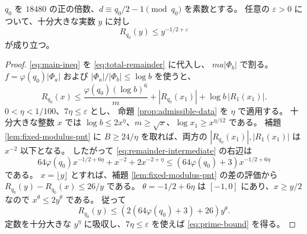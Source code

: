 \begin{corollary}[素数和の片側評価]\label{cor:prime-bound}
\(q_0\) を \(18480\) の正の倍数、\(d\equiv q_0/2-1\pmod{q_0}\) を素数とする。
任意の \(\varepsilon>0\) について、十分大きな実数 \(y\) に対し
\begin{equation}\label{eq:prime-bound}
 R_{q_0}(y)\le y^{-1/2+\varepsilon}
\end{equation}
が成り立つ。
\end{corollary}

\begin{proof}
\eqref{eq:main-ineq} を \eqref{eq:total-remainder} に代入し、
\(ma|\Phi_b|\) で割る。\(f=\varphi(q_0)|\Phi_a|\) および
\(|\Phi_a|/|\Phi_b|\le\log b\) を使うと、
\begin{equation}\label{eq:remainder-intermediate}
 R_{q_0}(x)
 \le\frac{\varphi(q_0)(\log b)^6}{m}
       +|R_{q_0}(x_1)|+\log b\,|R_1(x_1)|.
\end{equation}
\(0<\eta<1/100\)、\(7\eta\le\varepsilon\) とし、
命題 \ref{prop:admissible-data} を \(\eta\) で適用する。
十分大きな整数 \(x\) では
\(\log b\le2x^\eta\)、\(m\ge\sqrt{x}\)、\(\log x_1\ge x^{\eta/12}\) である。
補題 \ref{lem:fixed-modulus-pnt} に \(B\ge24/\eta\) を取れば、両方の
\(|R_{q_0}(x_1)|,|R_1(x_1)|\) は \(x^{-2}\) 以下となる。
したがって \eqref{eq:remainder-intermediate} の右辺は
\[
 64\varphi(q_0)x^{-1/2+6\eta}+x^{-2}+2x^{-2+\eta}
 \le (64\varphi(q_0)+3)x^{-1/2+6\eta}
\]
である。
\(x=\lfloor y\rfloor\) とすれば、補題 \ref{lem:fixed-modulus-pnt} の差の評価から
\(R_{q_0}(y)-R_{q_0}(x)\le26/y\) である。
\(\theta=-1/2+6\eta\) は \([-1,0]\) にあり、\(x\ge y/2\) なので
\(x^\theta\le2y^\theta\) である。
従って
\[
 R_{q_0}(y)\le (2(64\varphi(q_0)+3)+26)y^\theta .
\]
定数を十分大きな \(y^\eta\) に吸収し、\(7\eta\le\varepsilon\) を使えば
\eqref{eq:prime-bound} を得る。
\end{proof}

